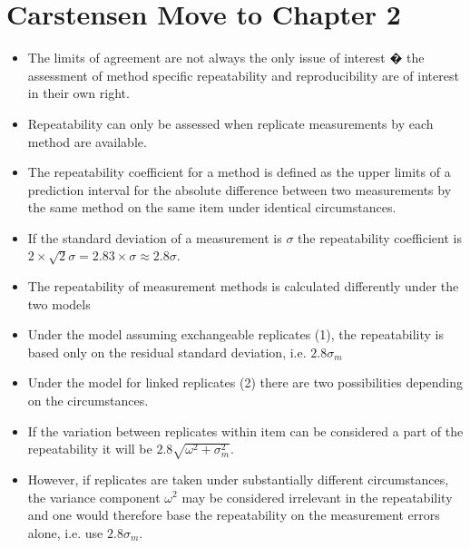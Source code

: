\documentclass[12pt, a4paper]{report}
\theoremstyle{plain}
\theoremstyle{definition}
\theoremstyle{remark}
\begin{document}
	\section{Carstensen Move to Chapter 2}
	\begin{itemize}
		\item The limits of agreement are not always the only issue of
		interest � the assessment of method specific repeatability and
		reproducibility are of interest in their own right.
		
		\item Repeatability can only be assessed when replicate
		measurements by each method are available.
		
		\item The repeatability coefficient for a method is defined as the
		upper limits of a prediction interval for the absolute difference
		between two measurements by the same method on the same item under
		identical circumstances.
		
		\item If the standard deviation of a measurement is $\sigma$ the
		repeatability coefficient is $2\times\sqrt{2} \sigma = 2.83\times
		\sigma \approx 2.8 \sigma$.
		
		
		\item The repeatability of measurement methods is calculated
		differently under the two models \item Under the model assuming
		exchangeable replicates (1), the repeatability is based only on
		the residual standard deviation, i.e. $2.8\sigma_m$
		
		
		\item Under the model for linked replicates (2) there are two
		possibilities depending on the circumstances.
		
		\item If the variation between replicates within item can be
		considered a part of the repeatability it will be $2.8 \sqrt{
			\omega^2 + \sigma^2_m}$.
		
		\item However, if replicates are taken under substantially
		different circumstances, the variance component $\omega^2$ may be
		considered irrelevant in the repeatability and one would therefore
		base the repeatability on the measurement errors alone, i.e. use
		$2.8 \sigma_m$.
	\end{itemize}
	
	
	
	
\end{document}
